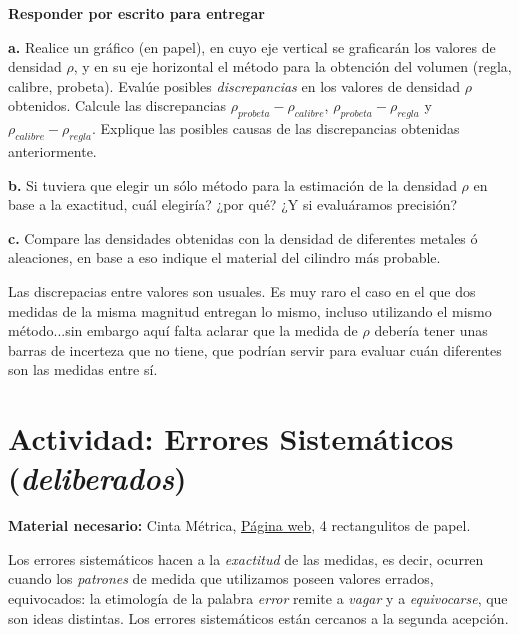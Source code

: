\documentclass[10pt,a4paper]{article}
\numberwithin{equation}{section}%
\numberwithin{equation}{subsection}
\begin{document}
\textbf{Responder por escrito para entregar}


\noindent \textbf{a.} Realice un gráfico (en papel), en cuyo eje vertical se graficarán los valores de densidad $\rho$, y en su eje horizontal el método para la obtención del volumen (regla, calibre, probeta). Evalúe posibles \textit{discrepancias} en los valores de densidad $\rho$ obtenidos. Calcule las discrepancias $\rho_{probeta} - \rho_{calibre}$, $\rho_{probeta} - \rho_{regla}$ y $\rho_{calibre} - \rho_{regla}$. Explique las posibles causas de las discrepancias obtenidas anteriormente. 

\noindent \textbf{b.} Si tuviera que elegir un sólo método para la estimación de la densidad $\rho$ en base a la exactitud, cuál elegiría? ¿por qué? ¿Y si evaluáramos precisión?

\noindent \textbf{c.} Compare las densidades obtenidas con la densidad de diferentes metales ó aleaciones, en base a eso indique el material del cilindro más probable. 

Las discrepacias entre valores son usuales. Es muy raro el caso en el que dos medidas de la misma magnitud entregan lo mismo, incluso utilizando el mismo método...sin embargo aquí falta aclarar que la medida de $\rho$ debería tener unas barras de incerteza que no tiene, que podrían servir para evaluar cuán diferentes son las medidas entre sí. 

\pagebreak

\section{Actividad: Errores Sistemáticos (\textit{deliberados})}

\textbf{Material necesario:} Cinta Métrica, \href{https://regla.online/}{Página web}, 4 rectangulitos de papel.

Los errores sistemáticos hacen a la \textit{exactitud} de las medidas, es decir, ocurren cuando los \textit{patrones} de medida que utilizamos poseen valores errados, equivocados: la etimología de la palabra \textit{error} remite a \textit{vagar} y a \textit{equivocarse}, que son ideas distintas. Los errores sistemáticos están cercanos a la segunda acepción.
\end{document}
